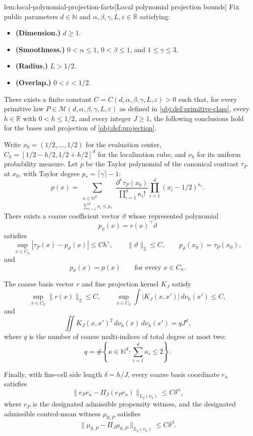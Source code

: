 \documentclass[11pt]{article}
\begin{document}
\begin{lemmav}{lem:local-polynomial-projection-facts}[Local polynomial projection bounds]
Fix public parameters \(d\in\mathbb N\) and \(\alpha,\beta,\gamma,L,\varepsilon\in\mathbb R\) satisfying:
\begin{itemize}
\item \textbf{(Dimension.)} \(d\ge1\).
\item \textbf{(Smoothness.)} \(0<\alpha\le1\), \(0<\beta\le1\), and \(1\le\gamma\le3\).
\item \textbf{(Radius.)} \(L>1/2\).
\item \textbf{(Overlap.)} \(0<\varepsilon<1/2\).
\end{itemize}
There exists a finite constant \(C=C(d,\alpha,\beta,\gamma,L,\varepsilon)>0\) such that, for every primitive law \(P\in\mathcal M(d,\alpha,\beta,\gamma,L,\varepsilon)\) as defined in \cref{obj:def:primitive-class}, every \(h\in\mathbb R\) with \(0<h\le1/2\), and every integer \(J\ge1\), the following conclusions hold for the bases and projection of \cref{obj:def:projection}.

Write \(x_0=(1/2,\ldots,1/2)\) for the evaluation center, \(C_h=[1/2-h/2,1/2+h/2]^d\) for the localization cube, and \(\nu_h\) for its uniform probability measure. Let \(p\) be the Taylor polynomial of the canonical contrast \(\tau_P\) at \(x_0\), with Taylor degree \(p_*=\lceil\gamma\rceil-1\):
\[
p(x)=
\sum_{\substack{\kappa\in\mathbb N^d\\ \sum_{i=1}^d\kappa_i\le p_*}}
\frac{\partial^\kappa\tau_P(x_0)}
     {\prod_{i=1}^d\kappa_i!}
\prod_{i=1}^d(x_i-1/2)^{\kappa_i}.
\]
There exists a coarse coefficient vector \(\vartheta\) whose represented polynomial
\[
p_\vartheta(x)=r(x)^\top\vartheta
\]
satisfies
\[
\sup_{x\in C_h}|\tau_P(x)-p_\vartheta(x)|\le Ch^\gamma,
\qquad
\|\vartheta\|_2\le C,
\qquad
p_\vartheta(x_0)=\tau_P(x_0),
\]
and
\[
p_\vartheta(x)=p(x)\qquad\text{for every }x\in C_h.
\]

The coarse basis vector \(r\) and fine projection kernel \(K_J\) satisfy
\[
\sup_{x\in C_h}\|r(x)\|_2\le C,
\qquad
\sup_{x\in C_h}\int |K_J(x,x')|\,d\nu_h(x')\le C,
\]
and
\[
\iint K_J(x,x')^2\,d\nu_h(x)\,d\nu_h(x')
=qJ^d,
\]
where \(q\) is the number of coarse multi-indices of total degree at most two:
\[
q=\#\left\{\kappa\in\mathbb N^d:\sum_{i=1}^d\kappa_i\le2\right\}.
\]

Finally, with fine-cell side length \(\delta=h/J\), every coarse basis coordinate \(r_u\) satisfies
\[
\|e_Pr_u-\Pi_J(e_Pr_u)\|_{L_2(\nu_h)}
\le C\delta^\alpha,
\]
where \(e_P\) is the designated admissible propensity witness, and the designated admissible control-mean witness \(\mu_{0,P}\) satisfies
\[
\|\mu_{0,P}-\Pi_J\mu_{0,P}\|_{L_2(\nu_h)}
\le C\delta^\beta.
\]
\end{lemmav}
\end{document}
